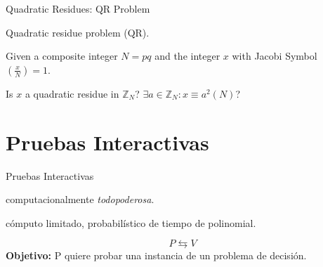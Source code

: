 \documentclass{beamer}
\begin{document}
\begin{frame}{Quadratic Residues: QR Problem}
	\begin{description}[Parameters]
		\item[Name] Quadratic residue problem (QR).
		\item[Parameters] Given a composite integer $N=pq$ and the integer $x$ with Jacobi Symbol $\left( \frac{x}{N} \right) = 1$.
		\item[Question] Is $x$ a quadratic residue in ${\mathbb Z}_N$? $\exists a\in {\mathbb Z}_N : x\equiv a^2 (N)$?
	\end{description}
\end{frame}



\section{Pruebas Interactivas}

\begin{frame}{Pruebas Interactivas}
	
	\begin{description}[Verificador (V)]
		\item[Probador (P)] computacionalmente \textit{todopoderosa}.
		\item[Verificador (V)] cómputo limitado, probabilístico de tiempo de polinomial.	
	\end{description}
	{\Large\[P \leftrightarrows  V\]}
	\textbf{Objetivo:} P quiere probar una instancia de un problema de decisión.

\end{frame}
\end{document}
